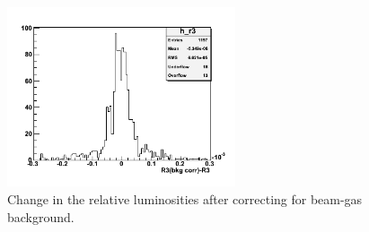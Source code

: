 \begin{figure}
  \begin{center}
    \includegraphics[width=0.6\textwidth]{figures/r-lumi-sys-bkg}
  \end{center}
  \caption{Change in the relative luminosities after correcting for beam-gas
  background.}
  \label{fig:r-lumi-sys-bkg}
\end{figure}
